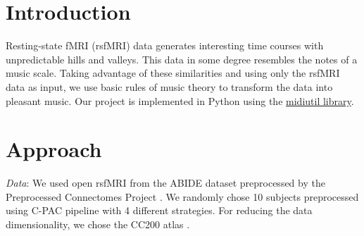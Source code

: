 \documentclass[twocolumn]{bmcart}%
\begin{document}
\begin{frontmatter}
\begin{fmbox}




%
\end{fmbox}%

\end{frontmatter}


\section{Introduction}\label{introduction}

Resting-state fMRI (rsfMRI) data generates interesting time courses with
unpredictable hills and valleys. This data in some degree resembles the
notes of a music scale. Taking advantage of these similarities and using
only the rsfMRI data as input, we use basic rules of music theory to
transform the data into pleasant music. Our project is implemented in
Python using the \href{https://code.google.com/p/midiutil/}{midiutil
library}.

\section{Approach}\label{approach}

\textit{Data}: We used open rsfMRI from the ABIDE dataset
\cite{di2014autism} preprocessed by the Preprocessed Connectomes Project
\cite{pcp}. We randomly chose 10 subjects preprocessed using C-PAC
pipeline \cite{Craddock2013c} with 4 different strategies. For reducing
the data dimensionality, we chose the CC200 atlas \cite{cc200}.
\end{document}
